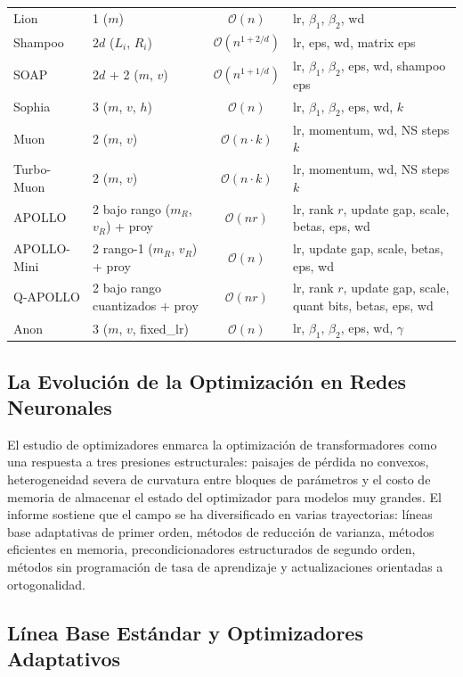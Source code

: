 \begin{longtable}{llcl}
Lion & 1 ($m$) & $\mathcal{O}(n)$ & lr, $\beta_1$, $\beta_2$, wd \\
Shampoo & $2d$ ($L_i$, $R_i$) & $\mathcal{O}(n^{1+2/d})$ & lr, eps, wd, matrix eps \\
SOAP & $2d$ + 2 ($m$, $v$) & $\mathcal{O}(n^{1+1/d})$ & lr, $\beta_1$, $\beta_2$, eps, wd, shampoo eps \\
Sophia & 3 ($m$, $v$, $h$) & $\mathcal{O}(n)$ & lr, $\beta_1$, $\beta_2$, eps, wd, $k$ \\
Muon & 2 ($m$, $v$) & $\mathcal{O}(n \cdot k)$ & lr, momentum, wd, NS steps $k$ \\
Turbo-Muon & 2 ($m$, $v$) & $\mathcal{O}(n \cdot k)$ & lr, momentum, wd, NS steps $k$ \\
APOLLO & 2 bajo rango ($m_R$, $v_R$) + proy & $\mathcal{O}(nr)$ & lr, rank $r$, update gap, scale, betas, eps, wd \\
APOLLO-Mini & 2 rango-1 ($m_R$, $v_R$) + proy & $\mathcal{O}(n)$ & lr, update gap, scale, betas, eps, wd \\
Q-APOLLO & 2 bajo rango cuantizados + proy & $\mathcal{O}(nr)$ & lr, rank $r$, update gap, scale, quant bits, betas, eps, wd \\
Anon & 3 ($m$, $v$, fixed\_lr) & $\mathcal{O}(n)$ & lr, $\beta_1$, $\beta_2$, eps, wd, $\gamma$ \\
\end{longtable}

\subsection{La Evolución de la Optimización en Redes Neuronales}
El estudio de optimizadores enmarca la optimización de transformadores como una respuesta a tres presiones estructurales: paisajes de pérdida no convexos, heterogeneidad severa de curvatura entre bloques de parámetros y el costo de memoria de almacenar el estado del optimizador para modelos muy grandes. El informe sostiene que el campo se ha diversificado en varias trayectorias: líneas base adaptativas de primer orden, métodos de reducción de varianza, métodos eficientes en memoria, precondicionadores estructurados de segundo orden, métodos sin programación de tasa de aprendizaje y actualizaciones orientadas a ortogonalidad.

\subsection{Línea Base Estándar y Optimizadores Adaptativos}
